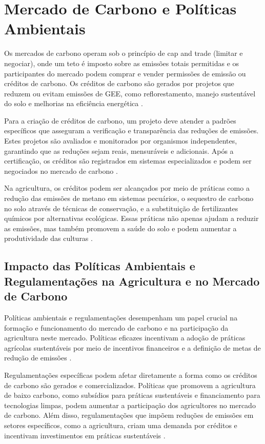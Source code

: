 \section{Mercado de Carbono e Políticas Ambientais}

Os mercados de carbono operam sob o princípio de cap and trade (limitar e negociar), onde um teto é imposto sobre as emissões totais permitidas e os participantes do mercado podem comprar e vender permissões de emissão ou créditos de carbono. Os créditos de carbono são gerados por projetos que reduzem ou evitam emissões de GEE, como reflorestamento, manejo sustentável do solo e melhorias na eficiência energética \cite{tietenberg2006}.

Para a criação de créditos de carbono, um projeto deve atender a padrões específicos que asseguram a verificação e transparência das reduções de emissões. Estes projetos são avaliados e monitorados por organismos independentes, garantindo que as reduções sejam reais, mensuráveis e adicionais. Após a certificação, os créditos são registrados em sistemas especializados e podem ser negociados no mercado de carbono \cite{schneider2011}.

Na agricultura, os créditos podem ser alcançados por meio de práticas como a redução das emissões de metano em sistemas pecuários, o sequestro de carbono no solo através de técnicas de conservação, e a substituição de fertilizantes químicos por alternativas ecológicas. Essas práticas não apenas ajudam a reduzir as emissões, mas também promovem a saúde do solo e podem aumentar a produtividade das culturas \cite{smith2007}.

\subsection{Impacto das Políticas Ambientais e Regulamentações na Agricultura e no Mercado de Carbono}

Políticas ambientais e regulamentações desempenham um papel crucial na formação e funcionamento do mercado de carbono e na participação da agricultura neste mercado. Políticas eficazes incentivam a adoção de práticas agrícolas sustentáveis por meio de incentivos financeiros e a definição de metas de redução de emissões \cite{harrison2008}.

Regulamentações específicas podem afetar diretamente a forma como os créditos de carbono são gerados e comercializados. Políticas que promovem a agricultura de baixo carbono, como subsídios para práticas sustentáveis e financiamento para tecnologias limpas, podem aumentar a participação dos agricultores no mercado de carbono. Além disso, regulamentações que impõem reduções de emissões em setores específicos, como a agricultura, criam uma demanda por créditos e incentivam investimentos em práticas sustentáveis \cite{kollmuss2008}.

